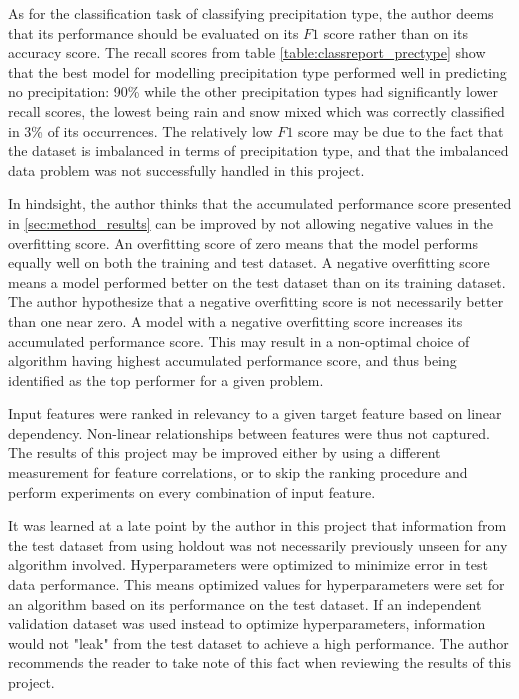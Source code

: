 	As for the classification task of classifying precipitation type, the author deems that its performance should be evaluated on its $F1$ score rather than on its accuracy score. The recall scores from table \ref{table:classreport_prectype} show that the best model for modelling precipitation type performed well in predicting no precipitation: 90\% while the other precipitation types had significantly lower recall scores, the lowest being rain and snow mixed which was correctly classified in 3\% of its occurrences. The relatively low $F1$ score may be due to the fact that the dataset is imbalanced in terms of precipitation type, and that the imbalanced data problem was not successfully handled in this project. 

	In hindsight, the author thinks that the accumulated performance score presented in \ref{sec:method_results} can be improved by not allowing negative values in the overfitting score. An overfitting score of zero means that the model performs equally well on both the training and test dataset. A negative overfitting score means a model performed better on the test dataset than on its training dataset. The author hypothesize that a negative overfitting score is not necessarily better than one near zero. A model with a negative overfitting score increases its accumulated performance score. This may result in a non-optimal choice of algorithm having highest accumulated performance score, and thus being identified as the top performer for a given problem.

	Input features were ranked in relevancy to a given target feature based on linear dependency. Non-linear relationships between features were thus not captured. The results of this project may be improved either by using a different measurement for feature correlations, or to skip the ranking procedure and perform experiments on every combination of input feature.

	It was learned at a late point by the author in this project that information from the test dataset from using holdout was not necessarily previously unseen for any algorithm involved. Hyperparameters were optimized to minimize error in test data performance. This means optimized values for hyperparameters were set for an algorithm based on its performance on the test dataset. If an independent validation dataset was used instead to optimize hyperparameters, information would not "leak" from the test dataset to achieve a high performance. The author recommends the reader to take note of this fact when reviewing the results of this project. 
	
